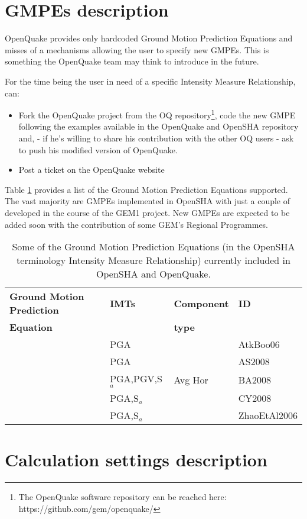 \section{GMPEs description}
\label{hazard:gmpe_selection}
OpenQuake provides only hardcoded Ground Motion Prediction Equations and misses of a mechanisms allowing the user to specify new GMPEs. This is something the OpenQuake team may think to introduce in the future. 

For the time being the user in need of a specific Intensity Measure Relationship, can:
\begin{itemize}
\item Fork the OpenQuake project from the OQ repository\footnote{ The OpenQuake software repository can be reached here: \hfill \newline  https://github.com/gem/openquake/}, code the new GMPE following the examples available in the OpenQuake and OpenSHA repository and, - if he's willing to share his contribution with the other OQ users - ask to push his modified version of OpenQuake. 
\item Post a ticket on the OpenQuake website  
\end{itemize}

Table \ref{tab:OQ_GMPEs} provides a list of the Ground Motion Prediction Equations supported. The vast majority are GMPEs implemented in OpenSHA with just a couple of developed in the course of the GEM1 project. New GMPEs are expected to be added soon with the contribution of some GEM's Regional Programmes.
%
\begin{table}[!t]
\centering
\begin{tabular}{llll} \hline
\textbf{Ground Motion Prediction} & \textbf{IMTs} & \textbf{Component } & \textbf{ID} \\
\textbf{Equation}& & \textbf{type} & \\ 
\hline
\cite{atkinson2006} & PGA & & AtkBoo06 \\
\cite{abrahamson2008} & PGA & & AS2008 \\
\cite{boore2008}  & PGA,PGV,S$_{a}$ & Avg Hor & BA2008 \\
\cite{chiou2008}  & PGA,S$_{a}$ &  & CY2008 \\
\cite{zhao2006}  & PGA,S$_{a}$ &  & ZhaoEtAl2006 \\
\hline
\end{tabular}
\caption{Some of the Ground Motion Prediction Equations (in the OpenSHA 
terminology Intensity Measure Relationship) currently included in OpenSHA 
and OpenQuake.}
\label{tab:OQ_GMPEs}
\end{table}
%
%
\section{Calculation settings description}
\label{hazard:calculation_settings}
%



